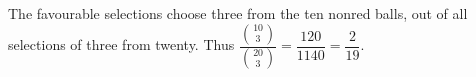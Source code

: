 The favourable selections choose three from the ten nonred balls, out of all selections of three from twenty. Thus $\dfrac{\binom{10}{3}}{\binom{20}{3}}=\dfrac{120}{1140}=\boxed{\dfrac{2}{19}}$.
